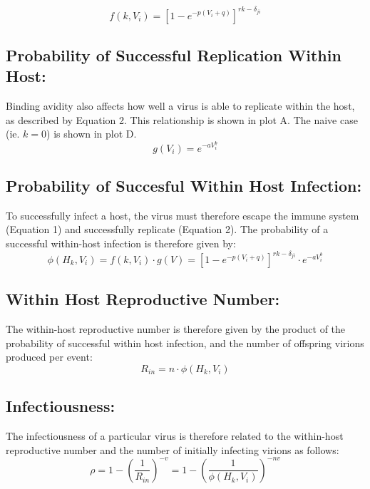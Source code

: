 \documentclass[a4paper,11pt,twoside]{article}
\begin{document}
\begin{equation}
  f(k,V_i) = [1-e^{-p(V_i+q)}]^{rk - \delta_{ji}}
\end{equation}

\subsection*{Probability of Successful Replication Within Host:}
Binding avidity also affects how well a virus is able to replicate within the host, as described by Equation 2. This relationship is shown in plot A. The naive case (ie. $k=0$) is shown in plot D.
\begin{equation}
g(V_i) = e^{-aV_i^b}
\end{equation}


\subsection*{Probability of Succesful Within Host Infection:}
To successfully infect a host, the virus must therefore escape the immune system (Equation 1) and successfully replicate (Equation 2). The probability of a successful within-host infection is therefore given by:
\begin{equation}
\phi(H_k,V_i) = f(k,V_i) \cdot g(V) = [1-e^{-p(V_i+q)}]^{rk - \delta_{ji}} \cdot e^{-aV_i^b}
\end{equation}


\subsection*{Within Host Reproductive Number:}
The within-host reproductive number is therefore given by the product of the probability of successful within host infection, and the number of offspring virions produced per event:
\begin{equation}
  R_{in} = n \cdot \phi(H_k,V_i)
\end{equation}


\subsection*{Infectiousness:}
The infectiousness of a particular virus is therefore related to the within-host reproductive number and the number of initially infecting virions as follows:
\begin{equation}
\rho = 1 - (\frac{1}{R_{in}})^{-v} = 1-(\frac{1}{\phi(H_k, V_i)})^{-nv}
\end{equation}
\end{document}

